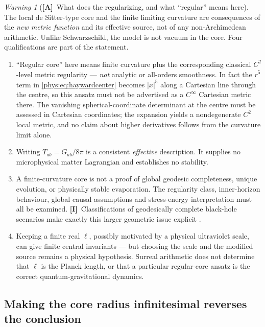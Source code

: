 \documentclass[11pt,letterpaper]{article}
\numberwithin{equation}{section}
\theoremstyle{definition}
\theoremstyle{remark}
\newtheorem{warning}[theorem]{Warning}
\newcommand{\abs}[1]{\lvert#1\rvert}
\newcommand{\TA}{\textcolor{TierA}{\textsf{\bfseries[A]}}}
\newcommand{\TI}{\textcolor{TierI}{\textsf{\bfseries[I]}}}
\begin{document}
\begin{warning}[\TA\ What does the regularizing, and what ``regular'' means
here]
\label{phys:warn:hayward}
The local de Sitter-type core and the finite limiting curvature are
consequences of the \emph{new metric function} and its effective source, not of
any non-Archimedean arithmetic. Unlike Schwarzschild, the model is not vacuum
in the core. Four qualifications are part of the statement.
\begin{enumerate}[label=\textup{(\alph*)},leftmargin=2.4em]
\item ``Regular core'' here means finite curvature plus the corresponding
classical $C^{2}$-level metric regularity --- \emph{not} analytic or
all-orders smoothness. In fact the $r^{5}$ term in
\eqref{phys:eq:haywardcenter} becomes $\abs x^{5}$ along a Cartesian line
through the centre, so this ansatz must not be advertised as a $C^{\infty}$
Cartesian metric there. The vanishing spherical-coordinate determinant at the
centre must be assessed in Cartesian coordinates; the expansion yields a
nondegenerate $C^{2}$ local metric, and no claim about higher derivatives
follows from the curvature limit alone.
\item Writing $T_{ab}=G_{ab}/8\pi$ is a consistent \emph{effective}
description. It supplies no microphysical matter Lagrangian and establishes no
stability.
\item A finite-curvature core is not a proof of global geodesic completeness,
unique evolution, or physically stable evaporation. The regularity class,
inner-horizon behaviour, global causal assumptions and stress-energy
interpretation must all be examined. \TI\ Classifications of geodesically
complete black-hole scenarios make exactly this larger geometric issue explicit
\cite{phys:CR}.
\item Keeping a finite real $\ell$, possibly motivated by a physical
ultraviolet scale, can give finite central invariants --- but choosing the
scale and the modified source remains a physical hypothesis. Surreal arithmetic
does not determine that $\ell$ is the Planck length, or that a particular
regular-core ansatz is the correct quantum-gravitational dynamics.
\end{enumerate}
\end{warning}

\subsection{Making the core radius infinitesimal reverses the conclusion}
\label{phys:sub:infinitesimalcore}
\end{document}
